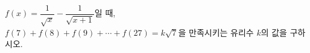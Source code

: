 $f(x)=\dfrac{1}{\sqrt{x}}-\dfrac{1}{\sqrt{x+1}}$일 때,\\ $f(7)+f(8)+f(9)+\cdots+f(27)=k\sqrt{7}$을 만족시키는 유리수 $k$의 값을 구하시오.
